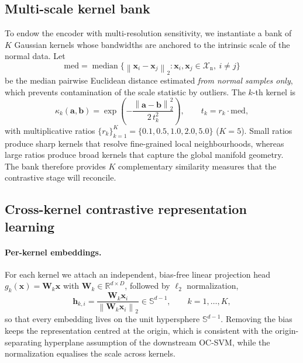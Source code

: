 \documentclass[times, review, 10pt]{elsarticle}
\newcommand{\R}{\mathbb{R}}
\newcommand{\Sph}{\mathbb{S}}
\newcommand{\norm}[1]{\left\lVert #1 \right\rVert}
\newcommand{\Xnorm}{\mathcal{X}_{\mathrm{n}}}
\newcommand{\hh}{\bm{h}}
\newcommand{\xx}{\bm{x}}
\newcommand{\WW}{\bm{W}}
\begin{document}
\subsection{Multi-scale kernel bank}
\label{subsec:kernels}

To endow the encoder with multi-resolution sensitivity, we instantiate a bank
of $K$ Gaussian kernels whose bandwidths are anchored to the intrinsic scale of
the normal data. Let
\begin{equation}
\mathrm{med}
=\operatorname{median}\!\big\{\norm{\xx_i-\xx_j}_2 :
\xx_i,\xx_j\in\Xnorm,\ i\neq j\big\}
\label{eq:median}
\end{equation}
be the median pairwise Euclidean distance estimated \emph{from normal samples
only}, which prevents contamination of the scale statistic by outliers. The
$k$-th kernel is
\begin{equation}
\kappa_k(\bm{a},\bm{b})
=\exp\!\left(-\frac{\norm{\bm{a}-\bm{b}}_2^{2}}{2\,t_k^{2}}\right),
\qquad
t_k = r_k\cdot\mathrm{med},
\label{eq:gaussian}
\end{equation}
with multiplicative ratios $\{r_k\}_{k=1}^{K}=\{0.1,0.5,1.0,2.0,5.0\}$
($K=5$). Small ratios produce sharp kernels that resolve fine-grained local
neighbourhoods, whereas large ratios produce broad kernels that capture the
global manifold geometry. The bank therefore provides $K$ complementary
similarity measures that the contrastive stage will reconcile.

\subsection{Cross-kernel contrastive representation learning}
\label{subsec:contrastive}

\paragraph{Per-kernel embeddings.}
For each kernel we attach an independent, bias-free linear projection head
$g_k(\xx)=\WW_k\xx$ with $\WW_k\in\R^{d\times D}$, followed by
$\ell_2$ normalization,
\begin{equation}
\hh_{k,i}
=\frac{\WW_k\xx_i}{\norm{\WW_k\xx_i}_2}\in\Sph^{d-1},
\qquad k=1,\dots,K,
\label{eq:embedding}
\end{equation}
so that every embedding lives on the unit hypersphere $\Sph^{d-1}$. Removing the
bias keeps the representation centred at the origin, which is consistent with
the origin-separating hyperplane assumption of the downstream OC-SVM, while the
normalization equalises the scale across kernels.
\end{document}
